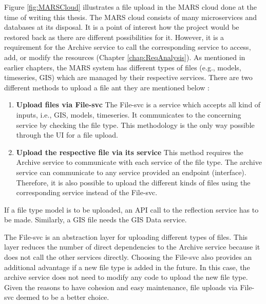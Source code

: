 Figure \ref{fig:MARSCloud} illustrates a file upload in the MARS cloud done at the time of writing this thesis. 
The MARS cloud consists of many 
microservices and databases at its disposal. It is a point of interest how the project would be restored back as there are different possibilities for it. 
However, it is a requirement for the Archive service
to call the corresponding service to access, add, or modify the resources (Chapter \ref{chap:ReqAnalysis}). As mentioned in earlier chapters, the MARS system
has different types of files (e.g., models, timeseries, GIS) which are managed by their respective services. There are two different methods to upload a file 
ant they are mentioned below :
\begin{enumerate}
 \item \textbf{Upload files via File-svc} The File-svc is a service which accepts all kind of inputs, i.e., GIS, models, timeseries. It communicates to the
 concerning service by checking the file type. This methodology is the only way possible through the UI for a file upload.   
 \item \textbf{Upload the respective file via its service} This method requires the Archive service to communicate with each service of the file type. 
The archive service can communicate to any service provided an endpoint (interface). Therefore, it is also possible to upload the different kinds of files using the
corresponding service instead of the File-svc. 
\end{enumerate} 

If a file type model is to be uploaded, an API call to the reflection service has to be made. Similarly, a GIS
file needs the GIS Data service.

The File-svc is an abstraction layer for uploading different types of files. This layer reduces the number of direct dependencies to the Archive
service because it does not call the other services directly. Choosing the File-svc also provides an additional advantage if a new file type is added in the future.
In this case, the archive service does not need to modify any code to upload the new file type. Given the reasons to have cohesion and easy maintenance, file uploads
via File-svc deemed to be a better choice. 


